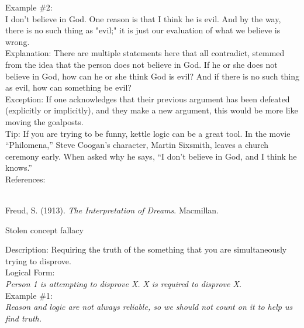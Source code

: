 \documentclass[a4paper,12pt,single,pdftex]{scrbook}
\begin{document}
    
      Example \#2:
    \\

    
      I don't believe in God. One reason is that I think he is evil. And by the way, there is no such thing as "evil;" it is just our evaluation of what we believe is wrong.
    \\

    
      Explanation: There are multiple statements here that all contradict, stemmed from the idea that the person does not believe in God. If he or she does not believe in God, how can he or she think God is evil? And if there is no such thing as evil, how can something be evil?
    \\

    
      Exception: If one acknowledges that their previous argument has been defeated (explicitly or implicitly), and they make a new argument, this would be more like moving the goalposts.
    \\

    
      Tip: If you are trying to be funny, kettle logic can be a great tool. In the movie “Philomena,” Steve Coogan’s character, Martin Sixsmith, leaves a church ceremony early. When asked why he says, “I don’t believe in God, and I think he knows.”
    \\

    References:

    
      
        
      \\

      
        
          Freud, S. (1913). {\it The Interpretation of Dreams}. Macmillan.
        
      
    
  

Stolen concept fallacy
    
      
        Description: Requiring the truth of the something that you are simultaneously trying to disprove.
      \\

      
        Logical Form:
      \\

      
        {\em Person 1 is attempting to disprove X.} \newline
{\em X is required to disprove X.}
      \\

      
        Example \#1:
      \\

      
        {\em Reason and logic are not always reliable, so we should not count on it to help us find truth.}
      \\
\end{document}
